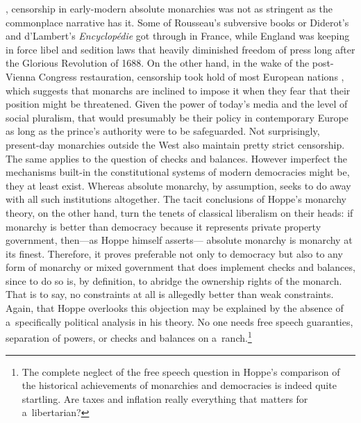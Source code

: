 {%
\parencite*[][pp.114–117]{henshall_myth_2013}, %
 censorship in early-modern absolute monarchies was not as stringent as the commonplace narrative has it. Some of Rousseau's subversive books or Diderot's and d'Lambert's \textit{Encyclopédie} got through in France, while England was keeping in force libel and sedition laws that heavily diminished freedom of press long after the Glorious Revolution of 1688. On the other hand, in the wake of the post-Vienna Congress restauration, censorship took hold of most European nations 
\parencite[][p.208]{henshall_myth_2013}, %
 which suggests that monarchs are inclined to impose it when they fear that their position might be threatened. Given the power of today's media and the level of social pluralism, that would presumably be their policy in contemporary Europe as long as the prince's authority were to be safeguarded. Not surprisingly, present-day monarchies outside the West also maintain pretty strict censorship. } The same applies to the question of checks and balances. However imperfect the mechanisms built-in the constitutional systems of modern democracies might be, they at least exist. Whereas absolute monarchy, by assumption, seeks to do away with all such institutions altogether. The tacit conclusions of Hoppe's monarchy theory, on the other hand, turn the tenets of classical liberalism on their heads: if monarchy is better than democracy because it represents private property government, then---as Hoppe 
\parencite*[][f.9]{hoppe_democracy_2007} %
 himself asserts--- absolute monarchy is monarchy at its finest. Therefore, it proves preferable not only to democracy but also to any form of monarchy or mixed government that does implement checks and balances, since to do so is, by definition, to abridge the ownership rights of the monarch. That is to say, no constraints at all is allegedly better than weak constraints. Again, that Hoppe overlooks this objection may be explained by the absence of a~specifically political analysis in his theory. No one needs free speech guaranties, separation of powers, or checks and balances on a~ranch.\footnote{The complete neglect of the free speech question in Hoppe's 
\parencite*[][pp.50–62]{hoppe_democracy_2007} %
 comparison of the historical achievements of monarchies and democracies is indeed quite startling. Are taxes and inflation really everything that matters for a~libertarian? }



